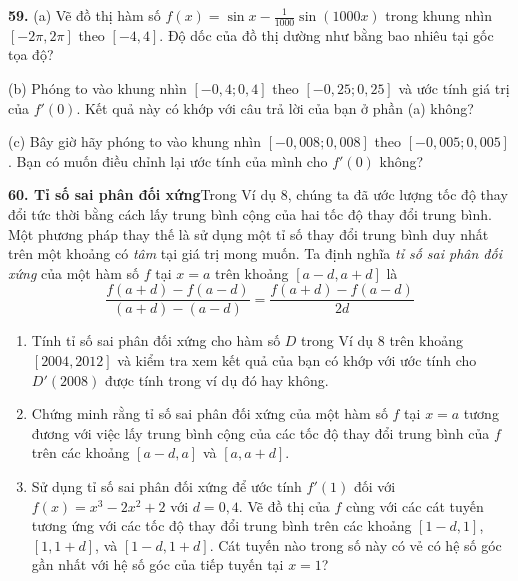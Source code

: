 \begin{minipage}[t]{0.66\linewidth}
  \fontsize{9}{12.2}\selectfont
  \noindent{}\hspace{0.4em}%
  \textbf{59.} (a) Vẽ đồ thị hàm số $f(x) = \sin x - \frac{1}{1000} \sin(1000x)$ trong khung nhìn $[-2\pi, 2\pi]$ theo $[-4, 4]$. Độ dốc của đồ thị dường như bằng bao nhiêu tại gốc tọa độ?
  
  \vspace{3pt}
  (b) Phóng to vào khung nhìn $[-0{,}4; 0{,}4]$ theo $[-0{,}25; 0{,}25]$ và ước tính giá trị của $f'(0)$. Kết quả này có khớp với câu trả lời của bạn ở phần (a) không?
  
  \vspace{3pt}
  (c) Bây giờ hãy phóng to vào khung nhìn $[-0{,}008; 0{,}008]$ theo $[-0{,}005; 0{,}005]$. Bạn có muốn điều chỉnh lại ước tính của mình cho $f'(0)$ không?

  \vspace{1em}
  \textbf{60. Tỉ số sai phân đối xứng}\quad Trong Ví dụ 8, chúng ta đã ước lượng tốc độ thay đổi tức thời bằng cách lấy trung bình cộng của hai tốc độ thay đổi trung bình. Một phương pháp thay thế là sử dụng một tỉ số thay đổi trung bình duy nhất trên một khoảng có \textit{tâm} tại giá trị mong muốn. Ta định nghĩa \textit{tỉ số sai phân đối xứng} của một hàm số $f$ tại $x = a$ trên khoảng $[a - d, a + d]$ là
  \[
  \frac{f(a + d) - f(a - d)}{(a + d) - (a - d)} = \frac{f(a + d) - f(a - d)}{2d}
  \]
  
  \begin{enumerate}[label=(\alph*), leftmargin=1.4em, itemsep=4pt, topsep=2pt]
    \item Tính tỉ số sai phân đối xứng cho hàm số $D$ trong Ví dụ 8 trên khoảng $[2004, 2012]$ và kiểm tra xem kết quả của bạn có khớp với ước tính cho $D'(2008)$ được tính trong ví dụ đó hay không.
    \item Chứng minh rằng tỉ số sai phân đối xứng của một hàm số $f$ tại $x = a$ tương đương với việc lấy trung bình cộng của các tốc độ thay đổi trung bình của $f$ trên các khoảng $[a - d, a]$ và $[a, a + d]$.
    \item Sử dụng tỉ số sai phân đối xứng để ước tính $f'(1)$ đối với $f(x) = x^3 - 2x^2 + 2$ với $d = 0{,}4$. Vẽ đồ thị của $f$ cùng với các cát tuyến tương ứng với các tốc độ thay đổi trung bình trên các khoảng $[1 - d, 1]$, $[1, 1 + d]$, và $[1 - d, 1 + d]$. Cát tuyến nào trong số này có vẻ có hệ số góc gần nhất với hệ số góc của tiếp tuyến tại $x = 1$?
  \end{enumerate}
\end{minipage}

